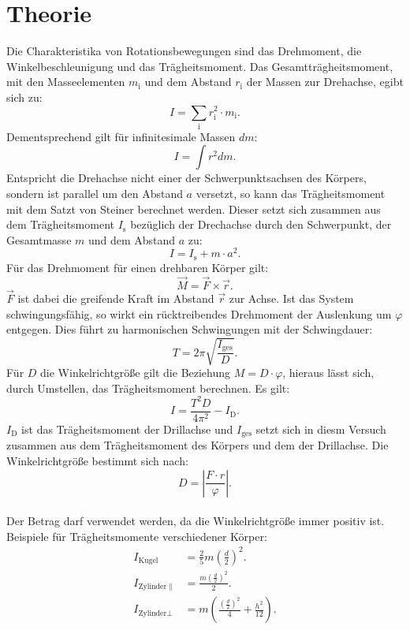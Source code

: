 \section{Theorie}
\label{sec:Theorie}

Die Charakteristika von Rotationsbewegungen sind das Drehmoment,
die Winkelbeschleunigung und das Trägheitsmoment.
Das Gesamtträgheitsmoment, mit den Masseelementen $m_{\mathrm{i}}$ und dem Abstand $r_{\mathrm{i}}$
der Massen zur Drehachse, egibt sich zu:
\begin{equation}
  I=\sum_{\mathrm{i}} r_{\mathrm{i}}^2\cdot m_{\mathrm{i}}.
\end{equation}
Dementsprechend gilt für infinitesimale Massen $dm$:
\begin{equation}
  I=\int r^2dm.
\end{equation}
Entspricht die Drehachse nicht einer der Schwerpunktsachsen des Körpers, sondern
ist parallel um den Abstand $a$ versetzt, so kann das Trägheitsmoment mit dem Satzt
von Steiner berechnet werden. Dieser setzt sich zusammen aus dem Trägheitsmoment $I_{\mathrm{s}}$
bezüglich der Drechachse durch den Schwerpunkt, der Gesamtmasse $m$ und dem Abstand $a$
zu:
\begin{equation}
  I=I_{\mathrm{s}}+m\cdot a^2.
\end{equation}
Für das Drehmoment für einen drehbaren Körper gilt:
\begin{equation}
 \vec{M}=\vec{F}\times\vec{r}.
\end{equation}
$\vec{F}$ ist dabei die greifende Kraft im Abstand $\vec{r}$ zur Achse.
Ist das System schwingungsfähig, so wirkt ein rücktreibendes Drehmoment
der Auslenkung um $\varphi$ entgegen. Dies führt zu harmonischen Schwingungen
mit der Schwingdauer:
\begin{equation}
  T=2\pi\sqrt{\frac{I_{\mathrm{{ges}}}}{D}}.
\end{equation}
Für $D$ die Winkelrichtgröße gilt die Beziehung $M=D\cdot\varphi$, hieraus lässt
sich, durch Umstellen, das Trägheitsmoment berechnen.
Es gilt:
\begin{equation}
 I=\frac{T^2 D}{4\pi^2}-I_{\mathrm{D}}.\label{eqn:I}
\end{equation}
$I_{\mathrm{D}}$ ist das Trägheitsmoment der Drillachse und $I_{\mathrm{ges}}$ setzt sich in diesm Versuch zusammen aus dem Trägheitsmoment des Körpers und dem der Drillachse.
Die Winkelrichtgröße bestimmt sich nach:
\begin{equation}
  D=\left|\frac{F\cdot r}{\varphi}\right|. \label{eqn:D}
\end{equation}\\
Der Betrag darf verwendet werden, da die Winkelrichtgröße immer positiv ist.
Beispiele für Trägheitsmomente verschiedener Körper:
\begin{align}
  I_{\mathrm{Kugel}}&=\frac{2}{5} m \left(\frac{d}{2}\right)^2.\label{eqn:Kugel}\\
  I_{\mathrm{Zylinder\parallel}}&=\frac{m\left(\frac{d}{2}\right)^2}{2}\label{eqn:zs}.\\
  I_{\mathrm{Zylinder\bot}}&=m\left(\frac{\left(\frac{d}{2}\right)^2}{4}+\frac{h^2}{12}\right).\label{eqn:zl}
\end{align}
